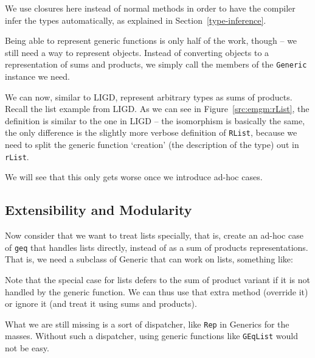\documentclass[abstracton,parskip=half]{scrreprt}
\newcommand{\cd}{\texttt}
\begin{document}
    We use closures here instead of normal methods in order to have the
    compiler infer the types automatically, as explained in Section~\ref{type-inference}.

    Being able to represent generic functions is only half of the work, though
    -- we still need a way to represent objects. Instead of converting objects
    to a representation of sums and products, we simply call the members of
    the \cd{Generic} instance we need.

    

    We can now, similar to  LIGD, represent arbitrary types as sums of products.
    Recall the list example from LIGD.
    As we can see in Figure~\ref{src:emgm:rList}, the definition is similar to
    the one in LIGD
    -- the isomorphism is basically the same, the only difference is the slightly
    more verbose definition of \cd{RList}, because we need to split the generic
    function `creation' (the description of the type) out in \cd{rList}.

    We will see that this only gets worse once we introduce ad-hoc cases.
    

    \subsection{Extensibility and Modularity}
    Now consider that we want to treat lists specially, that is, create an
    ad-hoc case of \cd{geq} that handles lists directly, instead of as a
    sum of products representations. That is, we need a subclass of Generic
    that can work on lists, something like:
    
    Note that the special case for lists defers to the sum of product variant
    if it is not handled by the generic function. We can thus use that extra
    method (override it) or ignore it (and treat it using sums and products).
    

    What we are still missing is a sort of dispatcher, like \cd{Rep} in Generics
    for the masses. Without such a dispatcher, using generic functions like
    \cd{GEqList} would not be easy.
\end{document}

